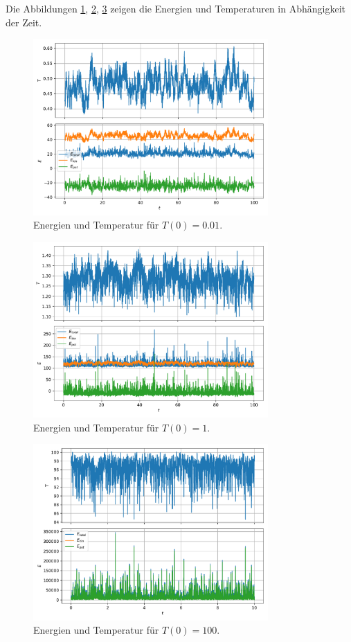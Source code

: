 \FloatBarrier
Die Abbildungen \ref{fig:obs_001}, \ref{fig:obs_1}, \ref{fig:obs_100} zeigen die Energien und Temperaturen in Abhängigkeit der Zeit.
\begin{figure}
    \centering
    \includegraphics[width=0.8\textwidth]{content/plots/obs_c)_T001.pdf}
    \caption{Energien und Temperatur für $T(0)=0.01$.}
    \label{fig:obs_001}
\end{figure}
\begin{figure}
    \centering
    \includegraphics[width=0.8\textwidth]{content/plots/obs_c)_T1.pdf}
    \caption{Energien und Temperatur für $T(0)=1$.}
    \label{fig:obs_1}
\end{figure}
\begin{figure}
    \centering
    \includegraphics[width=0.8\textwidth]{content/plots/obs_c)_T100.pdf}
    \caption{Energien und Temperatur für $T(0)=100$.}
    \label{fig:obs_100}
\end{figure}

